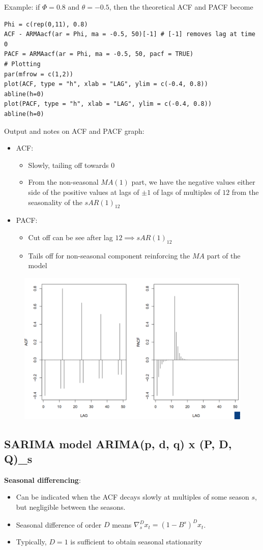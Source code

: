 \documentclass[11pt]{article}
\newcommand{\noi}{\noindent}
\begin{document}
\noi Example: if $\Phi = 0.8$ and $\theta = -0.5$, then the theoretical ACF and PACF become
\begin{lstlisting}
Phi = c(rep(0,11), 0.8)
ACF - ARMAacf(ar = Phi, ma = -0.5, 50)[-1] # [-1] removes lag at time 0
PACF = ARMAacf(ar = Phi, ma = -0.5, 50, pacf = TRUE)
# Plotting
par(mfrow = c(1,2))
plot(ACF, type = "h", xlab = "LAG", ylim = c(-0.4, 0.8))
abline(h=0)
plot(PACF, type = "h", xlab = "LAG", ylim = c(-0.4, 0.8))
abline(h=0)
\end{lstlisting}
\noi Output and notes on ACF and PACF graph:
\begin{itemize}
    \item ACF:
        \begin{itemize}
            \item Slowly, tailing off towards 0
            \item From the non-seasonal $MA(1)$ part, we have the negative values either side of the positive values at lags of $\pm1$ of lags of multiples of $12$ from the seasonality of the $sAR(1)_{12}$
        \end{itemize}
    \item PACF:
        \begin{itemize}
            \item Cut off can be see after lag $12 \implies sAR(1)_{12}$
            \item Tails off for non-seasonal component reinforcing the $MA$ part of the model
        \end{itemize}
\end{itemize}
\begin{figure}[H]
    \centering
    \includegraphics[width=0.8\linewidth]{ARMA multiplicative seasonal model - acf and pacf plot.png}
\end{figure}

\subsection{SARIMA model ARIMA(p, d, q) x (P, D, Q)_s}
\noi \textbf{Seasonal differencing}:
\begin{itemize}
    \item Can be indicated when the ACF decays slowly at multiples of some season $s$, but negligible between the seasons.
    \item Seasonal difference of order $D$ means $\nabla_{s}^{D}x_t = (1 - B^s)^Dx_t$.
    \item Typically, $D = 1$ is sufficient to obtain seasonal stationarity
\end{itemize} \phantom{i}
\end{document}
